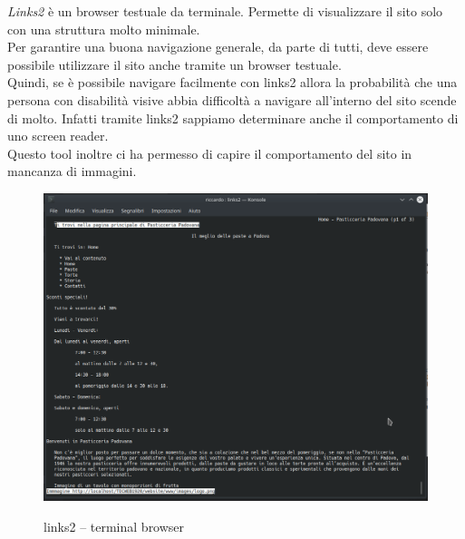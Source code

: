 \emph{Links2} è un browser testuale da terminale. Permette di visualizzare il sito solo con una struttura molto minimale. \\
Per garantire una buona navigazione generale, da parte di tutti, deve essere possibile utilizzare il sito anche tramite un browser testuale.\\
Quindi, se è possibile navigare facilmente con links2 allora la probabilità che una persona con disabilità visive abbia difficoltà a navigare
all'interno del sito scende di molto. Infatti tramite links2 sappiamo determinare anche il comportamento di uno screen reader.\\
Questo tool inoltre ci ha permesso di capire il comportamento del sito in mancanza di immagini.\\

\begin{figure}[!h]
	\centering
	\includegraphics[width=0.7\linewidth]{sezioni/FaseTest/Immagini/links2.png}\\
	\caption{links2 – terminal browser}
	\label{Fig:links2}
\end{figure} 
\newpage